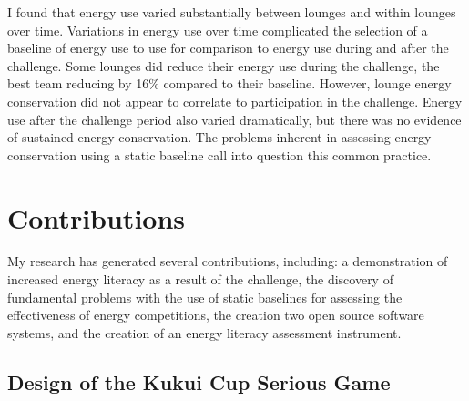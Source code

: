I found that energy use varied substantially between lounges and within lounges over time. Variations in energy use over time complicated the selection of a baseline of energy use to use for comparison to energy use during and after the challenge. Some lounges did reduce their energy use during the challenge, the best team reducing by 16\% compared to their baseline. However, lounge energy conservation did not appear to correlate to participation in the challenge. Energy use after the challenge period also varied dramatically, but there was no evidence of sustained energy conservation. The problems inherent in assessing energy conservation using a static baseline call into question this common practice.


\section{Contributions}
\label{sec:contributions}



My research has generated several contributions, including: a demonstration of increased energy literacy as a result of the challenge, the discovery of fundamental problems with the use of static baselines for assessing the effectiveness of energy competitions, the creation two open source software systems, and the creation of an energy literacy assessment instrument.


\subsection{Design of the Kukui Cup Serious Game}


